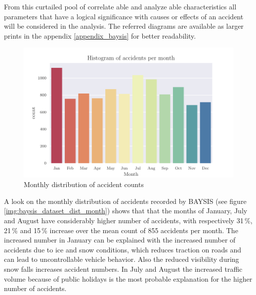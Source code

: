 From this curtailed pool of correlate able and analyze able characteristics all parameters that have a logical significance with causes or effects of an accident will be considered in the analysis.  The referred diagrams are available as larger prints in the appendix \autoref{appendix_baysis} for better readability. 

\begin{figure}[ht]
	\centering
	\includegraphics[scale=0.9]{CorrAnalysis/data/BAYSIS/01_dataset/plots/baysis_dataset_hist_month}
	\caption{Monthly distribution of accident counts}
	\label{img:baysis_dataset_dist_month}
\end{figure}

A look on the monthly distribution of accidents recorded by BAYSIS (see figure \autoref{img:baysis_dataset_dist_month}) shows that that the months of January, July and August have considerably higher number of accidents, with respectively 31\,\%, 21\,\% and 15\,\% increase over the mean count of 855 accidents per month. The increased number in January can be explained with the increased number of accidents due to ice and snow conditions, which reduces traction on roads and can lead to uncontrollable vehicle behavior. Also the reduced visibility during snow falls increases accident numbers. In July and August the increased traffic volume because of public holidays is the most probable explanation for the higher number of accidents. 

\clearpage

